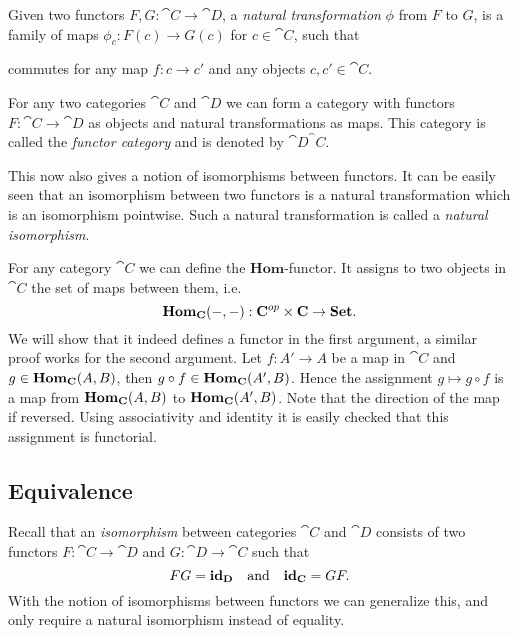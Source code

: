 \begin{definition}
	Given two functors $F, G: \cat{C} \to \cat{D}$, a \emph{natural transformation} $\phi$ from $F$ to $G$, is a family of maps $\phi_c : F(c) \to G(c)$ for $c \in \cat{C}$, such that
	\begin{center}
	\end{center}
	commutes for any map $f: c \to c'$ and any objects $c, c' \in \cat{C}$.
\end{definition}

For any two categories $\cat{C}$ and $\cat{D}$ we can form a category with functors $F: \cat{C} \to \cat{D}$ as objects and natural transformations as maps. This category is called the \emph{functor category} and is denoted by $\cat{D}^\cat{C}$.

This now also gives a notion of isomorphisms between functors. It can be easily seen that an isomorphism between two functors is a natural transformation which is an isomorphism pointwise. Such a natural transformation is called a \emph{natural isomorphism}.

For any category $\cat{C}$ we can define the $\mathbf{Hom}$-functor. It assigns to two objects in $\cat{C}$ the set of maps between them, i.e.
$$ \mathbf{Hom}_{\mathbf{C}}(-, -): \mathbf{C}^{op} \times \mathbf{C} \to \mathbf{Set}. $$
We will show that it indeed defines a functor in the first argument, a similar proof works for the second argument. Let $f: A' \to A$ be a map in $\cat{C}$ and $g \in \mathbf{Hom}_{\mathbf{C}}(A, B)$, then $g \circ f \in \mathbf{Hom}_{\mathbf{C}}(A', B)$. Hence the assignment $g \mapsto g \circ f$ is a map from $\mathbf{Hom}_{\mathbf{C}}(A, B)$ to $\mathbf{Hom}_{\mathbf{C}}(A', B)$. Note that the direction of the map if reversed. Using associativity and identity it is easily checked that this assignment is functorial.

\subsection{Equivalence}
Recall that an \emph{isomorphism} between categories $\cat{C}$ and $\cat{D}$ consists of two functors $F:\cat{C} \to \cat{D}$ and $G: \cat{D} \to \cat{C}$ such that
$$ FG = \mathbf{id}_{\mathbf{D}} \quad\text{and}\quad \mathbf{id}_{\mathbf{C}} = GF. $$
With the notion of isomorphisms between functors we can generalize this, and only require a natural isomorphism instead of equality.

